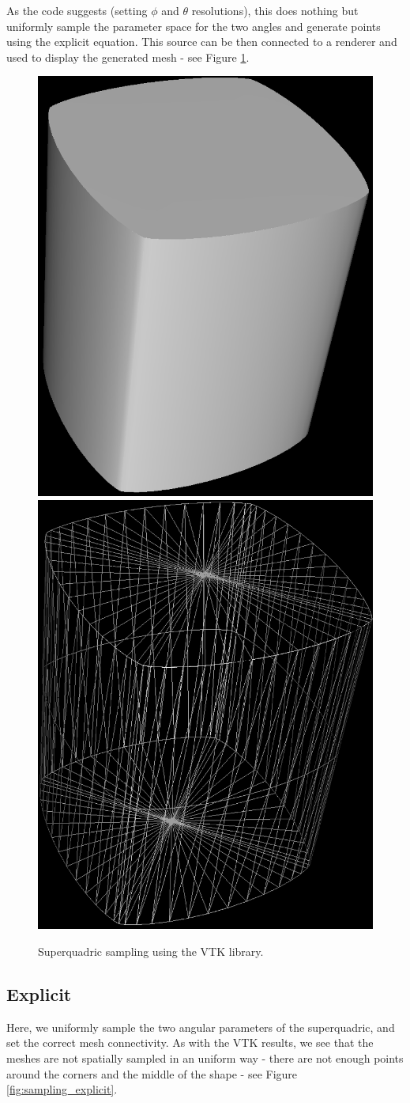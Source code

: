 \documentclass{article}
\begin{document}
As the code suggests (setting $\phi$ and $\theta$ resolutions), this does nothing but uniformly sample the parameter space for the two angles and generate points using the explicit equation. This source can be then connected to a renderer and used to display the generated mesh - see Figure \ref{fig:sampling_VTK}.

\begin{figure}
\centering
\includegraphics[width=0.25\columnwidth]{figures/sampling_VTK_solid}
\hspace {1cm}
\includegraphics[width=0.25\columnwidth]{figures/sampling_VTK_wireframe}
\caption {Superquadric sampling using the VTK library.}
\label{fig:sampling_VTK}
\end{figure}


\subsection {Explicit}

Here, we uniformly sample the two angular parameters of the superquadric, and set the correct mesh connectivity. As with the VTK results, we see that the meshes are not spatially sampled in an uniform way - there are not enough points around the corners and the middle of the shape - see Figure \ref{fig:sampling_explicit}.
\end{document}

